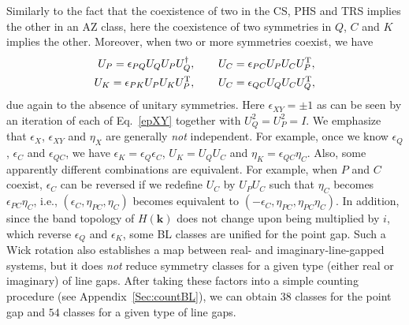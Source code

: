 \documentclass{tADP2e}
\theoremstyle{plain}
\theoremstyle{plain}
\theoremstyle{definition}
\begin{document}
Similarly to the fact that the coexistence of two in the CS, PHS and TRS implies the other in an AZ class, here the coexistence of two symmetries in $Q$, $C$ and $K$ implies the other. Moreover, when two or more symmetries coexist, we have 
\begin{equation}
\begin{split}
U_P=\epsilon_{PQ}U_QU_PU_Q^\dag,\;\;\;\;\;\;\;\;&U_C=\epsilon_{PC}U_PU_CU_P^{\rm T}, \\
U_K=\epsilon_{PK}U_PU_KU_P^{\rm T},\;\;\;\;\;\;\;\;&U_C=\epsilon_{QC}U_QU_CU_Q^{\rm T}, 
\end{split}
\label{epXY}
\end{equation}
due again to the absence of unitary symmetries. Here $\epsilon_{XY}=\pm1$ as can be seen by %
an iteration of each of Eq.~\eqref{epXY} together with $U_Q^2=U_P^2=I$. We emphasize that $\epsilon_X$, $\epsilon_{XY}$ and $\eta_X$ are generally \emph{not} independent. For example, once we know $\epsilon_Q$, $\epsilon_C$ and $\epsilon_{QC}$, we have $\epsilon_K=\epsilon_Q\epsilon_C$, $U_K=U_QU_C$ and $\eta_K=\epsilon_{QC}\eta_C$. Also, some apparently different combinations are equivalent. For example, when $P$ and $C$ coexist, $\epsilon_C$ can be reversed if we redefine $U_C$ by $U_PU_C$ such that $\eta_C$ becomes $\epsilon_{PC}\eta_C$, i.e., $(\epsilon_C,\eta_{PC},\eta_C)$ becomes equivalent to $(-\epsilon_C,\eta_{PC},\eta_{PC}\eta_C)$. In addition, since the band topology of $H(\boldsymbol{k})$ does not change upon being multiplied by $i$, which reverse $\epsilon_Q$ and $\epsilon_K$, some BL classes are unified for the point gap. Such a Wick rotation also establishes a map between real- and imaginary-line-gapped systems, but it does \emph{not} reduce symmetry classes for a given type (either real or imaginary) of line gaps.  After  taking these factors into a simple counting procedure (see Appendix~\ref{Sec:countBL}), we can obtain $38$ classes for the point gap and $54$ classes for a given type of line gaps. 
\end{document}
